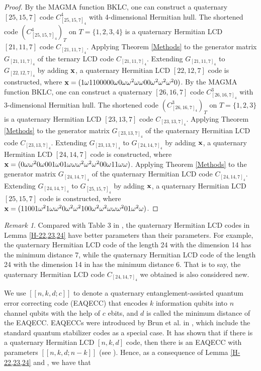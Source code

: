 \documentclass[12pt,twoside]{article}
\theoremstyle{plain}
\theoremstyle{definition}
\theoremstyle{remark}
\newtheorem{remark}[theorem]{Remark}
\begin{document}
\begin{proof}
By the MAGMA function BKLC, one can construct a quaternary $[25,15,7]$ code $C^{4}_{[25,15,7]_4}$ with 4-dimensional Hermitian hull.
The shortened code $(C^{4}_{[25,15,7]_4})_{T}$ on $T=\{1,2,3,4\}$ is a quaternary Hermitian LCD $[21,11,7]$ code $C_{[21,11,7]_4}$. Applying Theorem \ref{Methods} to the generator matrix $G_{[21,11,7]_4}$ of the ternary LCD code $C_{[21,11,7]_4}$. Extending $G_{[21,11,7]_4}$ to $G_{[22,12,7]_4}$ by adding ${\bf x}$, a quaternary Hermitian LCD $[22,12,7]$ code is constructed, where ${\bf x}=(1 \omega 1 1 0 0 0 0 0 \omega 0 \omega \omega^2 \omega \omega 0 0 \omega^2 \omega^2 \omega^2 0)$.
By the MAGMA function BKLC, one can construct a quaternary $[26,16,7]$ code $C^{3}_{[26,16,7]_4}$ with 3-dimensional Hermitian hull.
The shortened code $(C^{3}_{[26,16,7]_4})_{T}$ on $T=\{1,2,3\}$ is a quaternary Hermitian LCD $[23,13,7]$ code $C_{[23,13,7]_4}$.
Applying Theorem \ref{Methods} to the generator matrix $G_{[23,13,7]_4}$ of the quaternary Hermitian LCD code $C_{[23,13,7]_4}$. Extending $G_{[23,13,7]_4}$ to $G_{[24,14,7]_4}$ by adding ${\bf x}$, a quaternary Hermitian LCD $[24,14,7]$ code is constructed, where ${\bf x}=(0 \omega \omega^2 0 \omega 0 0 1 \omega 0 1 \omega \omega \omega^2 \omega^2 \omega^2 0 0 \omega 1 1\\ \omega \omega)$.
Applying Theorem \ref{Methods} to the generator matrix $G_{[24,14,7]_4}$ of the quaternary Hermitian LCD code $C_{[24,14,7]_4}$. Extending $G_{[24,14,7]_4}$ to $G_{[25,15,7]_4}$ by adding ${\bf x}$, a quaternary Hermitian LCD $[25,15,7]$ code is constructed, where ${\bf x}=(1 1 0 0 1 \omega^2 1 \omega \omega^2 0 \omega^2 \omega^2 1 0 0 \omega^2 \omega^2 \omega \omega \omega^2 0 1 \omega^2 \omega)$.
\end{proof}

\begin{remark}
Compared with Table 3 in \cite{H-25}, the quaternary Hermitian LCD codes in Lemma \ref{H-22,23,24} have better parameters than their parameters.
For example,
the quaternary Hermitian LCD code of the length 24 with the dimension 14 has the minimum distance 7, while the quaternary Hermitian LCD code of the length 24 with the dimension 14 in \cite[Table 3]{H-25} has the minimum distance 6. That is to say, the quaternary Hermitian LCD code $C_{[24,14,7]_4}$ we obtained is also considered new.
\end{remark}



We use $[[n,k,d;c]]$ to denote a quaternary entanglement-assisted quantum error correcting code (EAQECC) that encodes $k$ information qubits into $n$ channel qubits with the help of $c$ ebits, and $d$ is called the minimum distance of the EAQECC. EAQECCs were introduced by Brun et al. in \cite{EAQECC}, which include the standard quantum stabilizer codes as a special case.
It has shown that if there is a quaternary Hermitian
LCD $[n, k, d]$ code, then there is an EAQECC with parameters $[[n, k, d; n - k]]$ (see \cite{H-20}). Hence, as a consequence of Lemma \ref{H-22,23,24} and \cite[Lemma 3.3]{H-lCD-k=3}, we have that
\end{document}
